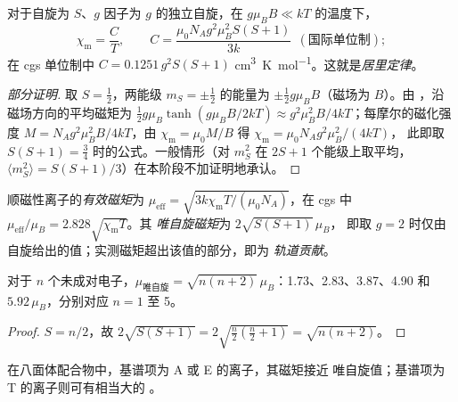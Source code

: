 \begin{theorem}[居里定律]\label{thm:b3:complex-spectra-magnetism:curie}
对于自旋为 $S$、$g$ 因子为 $g$ 的独立自旋，在 $g\mu_BB \ll kT$ 的温度下，
\[
  \chi_{\mathrm m} = \frac{C}{T}, \qquad C = \frac{\mu_0N_Ag^2\mu_B^2S(S+1)}{3k}\ \ (\text{国际单位制});
\]
在 cgs 单位制中 $C = 0.1251\,g^2S(S+1)$ \unit{cm^3.K.mol^{-1}}。这就是\emph{居里定律}。
\end{theorem}

\begin{proof}[部分证明]
取 $S = \frac12$，两能级 $m_S = \pm\frac12$ 的能量为 $\pm\frac12g\mu_BB$（磁场为 $B$）。由
，沿磁场方向的平均磁矩为 $\frac12g\mu_B\tanh(g\mu_BB/2kT) \approx
g^2\mu_B^2B/4kT$；每摩尔的磁化强度 $M = N_Ag^2\mu_B^2B/4kT$，由 $\chi_{\mathrm m} = \mu_0M/B$ 得 $\chi_{\mathrm m} = \mu_0N_Ag^2\mu_B^2/(4kT)$，
此即取 $S(S+1) = \frac34$ 时的公式。一般情形（对 $m_S^2$ 在 $2S + 1$
个能级上取平均，$\langle m_S^2\rangle = S(S+1)/3$）在本阶段不加证明地承认。
\end{proof}

\begin{definition}[有效磁矩]\label{def:b3:complex-spectra-magnetism:moment}
顺磁性离子的\emph{有效磁矩}为
$\mu_{\mathrm{eff}} = \sqrt{3k\chi_{\mathrm m}T/(\mu_0N_A)}$，在 cgs 中 $\mu_{\mathrm{eff}}/\mu_B = 2.828\sqrt{\chi_{\mathrm m}T}$。其
\emph{唯自旋磁矩}为 $2\sqrt{S(S+1)}\,\mu_B$，
即取 $g = 2$ 时仅由自旋给出的值；实测磁矩超出该值的部分，即为
\emph{轨道贡献}。
\end{definition}

\begin{proposition}[唯自旋公式]\label{prop:b3:complex-spectra-magnetism:spin-only}
对于 $n$ 个未成对电子，$\mu_{\text{唯自旋}} = \sqrt{n(n+2)}\,\mu_B$：1.73、2.83、3.87、4.90 和 $5.92\,\mu_B$，分别对应
$n = 1$ 至 5。
\end{proposition}

\begin{proof}
$S = n/2$，故 $2\sqrt{S(S+1)} = 2\sqrt{\frac n2(\frac n2 + 1)} = \sqrt{n(n+2)}$。
\end{proof}

\begin{proposition}[轨道贡献]\label{prop:b3:complex-spectra-magnetism:orbital-contribution}
在八面体配合物中，基谱项为 A 或 E 的离子，其磁矩接近
唯自旋值；基谱项为 T 的离子则可有相当大的
。
\end{proposition}

